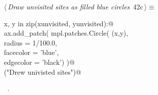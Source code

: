 \documentclass[11.5pt]{report}
\begin{document}
\begin{flushleft} \small\label{scrap56}\raggedright\small
{} $\langle\,${\itshape Draw unvisited sites as filled blue circles}\nobreak\ {\footnotesize {42c}}$\,\rangle\equiv$
\vspace{-1ex}
\begin{list}{}{} \item
\mbox{}\verb@for x, y in zip(xunvisited, yunvisited):@\\
\mbox{}\verb@     ax.add_patch( mpl.patches.Circle( (x,y),\@\\
\mbox{}\verb@                                    radius    = 1/100.0,\@\\
\mbox{}\verb@                                    facecolor = 'blue',\@\\
\mbox{}\verb@                                    edgecolor = 'black')  )@\\
\mbox{}\verb@debug("Drew univisted sites")@\\
\mbox{}\verb@@{\NWsep}
\end{list}
\vspace{-1.5ex}
\footnotesize
\begin{list}{}{\setlength{\itemsep}{-\parsep}\setlength{\itemindent}{-\leftmargin}}
\item \NWtxtMacroRefIn\ .

\item{}
\end{list}
\vspace{4ex}
\end{flushleft}


\vspace{-0.8cm}\newchunk 
\end{document}
